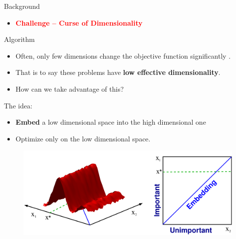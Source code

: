 \documentclass[final]{beamer}
\begin{document}
\begin{frame}[t]
\begin{columns}[T]
\begin{column}{.48\textwidth}
\begin{block}{Background}
 \begin{itemize}
    \item {\bf \textcolor{red}{ Challenge -- Curse of Dimensionality}}
   \end{itemize}
\end{block}

\begin{block}{Algorithm}

     \begin{itemize}
      \item Often, only few dimensions change the objective function significantly
       \textcolor{gray}{\cite{Bergstra:2012, Hutter:2013_KeyParameters}}.
      \item That is to say these problems have 
       {\bf \textcolor{myColor}{low effective dimensionality}}.
       \item How can we take advantage of this?
     \end{itemize}

    
    The idea:
   \begin{itemize}
    \item {\bf \textcolor{myColor}{Embed}} 
     a low dimensional space into the high dimensional one
    \item Optimize
     only on the low dimensional space.
   \end{itemize}

  \begin{figure}[t]
   \includegraphics[width = 0.9\columnwidth]
   {../paper/figures/2to1embedding}
   \label{fig:ESSL_BLR}
  \end{figure}
  

\end{block}
\end{column}
\end{columns}
\end{frame}
\end{document}
